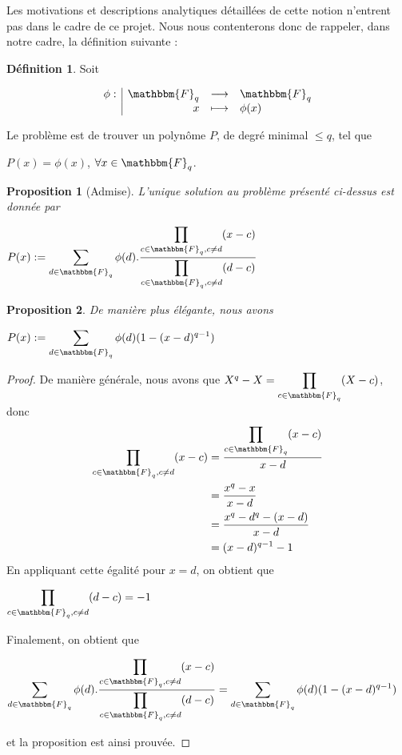 \documentclass[12pt]{article}
\newcommand{\Fq}{\mathbbm{F}_q}
\newcommand{\fonction}[5]{
\begin{displaymath}
\begin{array}{l|rcl}
\displaystyle
#1 : & #2 & \longrightarrow & #3 \\
    & #4 & \longmapsto & #5
\end{array}
\end{displaymath}
}
\newtheorem{prop}{Proposition}
\theoremstyle{definition}
\newtheorem{definition}{Définition}
\begin{document}
Les motivations et descriptions analytiques détaillées de cette notion n'entrent pas dans le cadre de ce projet. Nous nous contenterons donc de rappeler, dans notre cadre, la définition suivante :

\begin{definition}
Soit
\fonction{\phi}{\Fq}{\Fq}{x}{\phi(x)}
Le problème est de trouver un polynôme $P$, de degré minimal $\le q$, tel que 
	\begin{center} $P(x) = \phi(x)$, $\forall  x \in \Fq$. \end{center}
\end{definition}

\begin{prop}[Admise]
L'unique solution au problème présenté ci-dessus est donnée par 
	\begin{center} $P(x) := \displaystyle\sum_{d \in \Fq} \phi(d).\displaystyle\frac{\displaystyle\prod_{c \in \Fq, c \ne d }(x - c)}{\displaystyle\prod_{c \in \Fq, c \ne d}(d -c)}$\end{center}
\end{prop}

\begin{prop}
De manière plus élégante, nous avons
	\begin{center} $P(x) := \displaystyle \sum_{d \in \Fq } \phi(d) (1 - (x-d)^{q-1}) $ \end{center}
\end{prop}

\begin{proof}De manière générale, nous avons que $X^q - X = \displaystyle\prod_{c \in \Fq} (X-c)$, donc \newline
	\begin{align*} 
		\displaystyle\prod_{c \in \Fq, c \ne d}(x - c) &= \frac{\displaystyle\prod_{c \in \Fq}(x - c)}{x - d}\\
		 &= \displaystyle\frac{x^q - x}{x-d} \\
		 &= \displaystyle\frac{x^q - d^q - (x-d)}{x-d} \\
		 &= (x-d)^{q-1} - 1
	\end{align*}
En appliquant cette égalité pour $x = d$, on obtient que \begin{center} $\displaystyle\prod_{c \in \Fq, c \ne d }(d - c) = -1$ \end{center}
Finalement, on obtient que 
\begin{center} $ \displaystyle\sum_{d \in \Fq} \phi(d).\displaystyle\frac{\displaystyle\prod_{c \in \Fq, c \ne d }(x - c)}{\displaystyle\prod_{c \in \Fq, c \ne d}(d -c)} =  \displaystyle \sum_{d \in \Fq } \phi(d) (1 - (x-d)^{q-1})$  \end{center}
et la proposition est ainsi prouvée.
\end{proof}
\end{document}
